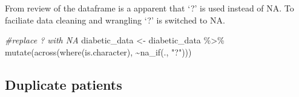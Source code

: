 \documentclass[
]{article}
\newenvironment{Shaded}{\begin{snugshade}}{\end{snugshade}}
\newcommand{\CommentTok}[1]{\textcolor[rgb]{0.56,0.35,0.01}{\textit{#1}}}
\newcommand{\FunctionTok}[1]{\textcolor[rgb]{0.00,0.00,0.00}{#1}}
\newcommand{\NormalTok}[1]{#1}
\newcommand{\OtherTok}[1]{\textcolor[rgb]{0.56,0.35,0.01}{#1}}
\newcommand{\SpecialCharTok}[1]{\textcolor[rgb]{0.00,0.00,0.00}{#1}}
\newcommand{\StringTok}[1]{\textcolor[rgb]{0.31,0.60,0.02}{#1}}
\begin{document}
From review of the dataframe is a apparent that `?' is used instead of
NA. To faciliate data cleaning and wrangling `?' is switched to NA.

\begin{Shaded}
\begin{Highlighting}[]
\CommentTok{\#replace \textquotesingle{}?\textquotesingle{} with NA}
\NormalTok{diabetic\_data }\OtherTok{\textless{}{-}}\NormalTok{ diabetic\_data }\SpecialCharTok{\%\textgreater{}\%}
  \FunctionTok{mutate}\NormalTok{(}\FunctionTok{across}\NormalTok{(}\FunctionTok{where}\NormalTok{(is.character), }\SpecialCharTok{\textasciitilde{}}\FunctionTok{na\_if}\NormalTok{(., }\StringTok{"?"}\NormalTok{)))}
\end{Highlighting}
\end{Shaded}

\hypertarget{duplicate-patients}{%
\subsection{Duplicate patients}\label{duplicate-patients}}
\end{document}
